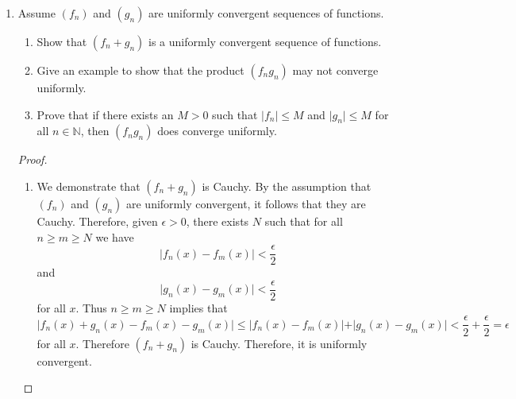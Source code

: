 \begin{enumerate}
    \item Assume \( (f_n) \) and \( (g_n) \) are uniformly convergent sequences of functions.
    \begin{enumerate}
        \item Show that \( (f_n+g_n) \) is a uniformly convergent sequence of functions.
        
        \item Give an example to show that the product \( (f_ng_n) \) may not converge uniformly.
        
        \item Prove that if there exists an \( M > 0 \) such that \( \vert f_n \vert \leq M \) and \( \vert g_n \vert \leq M \) for all \( n \in \mathbb{N} \), then \( (f_ng_n) \) does converge uniformly.
    \end{enumerate}
    
    \begin{proof}
    \begin{enumerate}
        \item We demonstrate that \( (f_n+g_n) \) is Cauchy. By the assumption that \( (f_n) \) and \( (g_n) \) are uniformly convergent, it follows that they are Cauchy. Therefore, given \( \epsilon > 0 \), there exists \( N \) such that for all \( n\geq m \geq N \) we have
        \[
        \vert f_n(x) - f_m(x) \vert < \frac{\epsilon}{2}
        \]
        and 
        \[
        \vert g_n(x) - g_m(x) \vert < \frac{\epsilon}{2}
        \]
        for all \( x \). Thus \( n \geq m \geq N \) implies that
        \[
        \vert f_n(x) + g_n(x) - f_m(x) - g_m(x) \vert \leq \vert f_n(x) - f_m(x) \vert + \vert g_n(x) - g_m(x) \vert < \frac{\epsilon}{2} + \frac{\epsilon}{2} = \epsilon 
        \]
        for all \( x \). Therefore \( (f_n+g_n) \) is Cauchy. Therefore, it is uniformly convergent. 
        

\end{enumerate}
\end{proof}
\end{enumerate}
